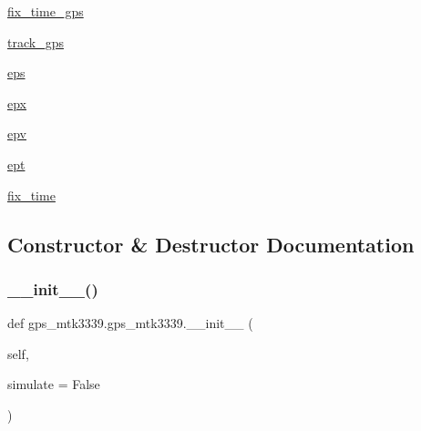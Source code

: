 \begin{DoxyCompactItemize}
\item 
\hyperlink{classgps__mtk3339_1_1gps__mtk3339_a05d58c10be98511bb26422b037f88c84}{fix\+\_\+time\+\_\+gps}
\item 
\hyperlink{classgps__mtk3339_1_1gps__mtk3339_a6e35fca669effcbdedeaec3c4767dddc}{track\+\_\+gps}
\item 
\hyperlink{classgps__mtk3339_1_1gps__mtk3339_a9a2bb8e7c1cfc87bec2f26521acdf093}{eps}
\item 
\hyperlink{classgps__mtk3339_1_1gps__mtk3339_aad9f939ba52d3f70339275d1773a74fa}{epx}
\item 
\hyperlink{classgps__mtk3339_1_1gps__mtk3339_a81312e77abb16d7241b40d64173703aa}{epv}
\item 
\hyperlink{classgps__mtk3339_1_1gps__mtk3339_a4821ad999987d73199ca687497d109ce}{ept}
\item 
\hyperlink{classgps__mtk3339_1_1gps__mtk3339_a20597647b6fc2da5e4a7d80274006714}{fix\+\_\+time}
\end{DoxyCompactItemize}


\subsection{Constructor \& Destructor Documentation}
\mbox{\label{classgps__mtk3339_1_1gps__mtk3339_aef9ef03ebb7337c94b529d949fa494d4}} 
\subsubsection{\texorpdfstring{\+\_\+\+\_\+init\+\_\+\+\_\+()}{\_\_init\_\_()}}
{\footnotesize\ttfamily def gps\+\_\+mtk3339.\+gps\+\_\+mtk3339.\+\_\+\+\_\+init\+\_\+\+\_\+ (\begin{DoxyParamCaption}\item[{}]{self,  }\item[{}]{simulate = {\ttfamily False} }\end{DoxyParamCaption})}

\mbox{\label{classgps__mtk3339_1_1gps__mtk3339_a5dc9478c99bcdc50e5584d202d141659}} 
